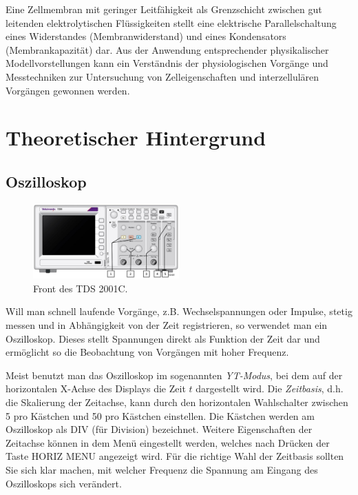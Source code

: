 Eine Zellmembran mit geringer Leitfähigkeit als Grenzschicht zwischen gut leitenden elektrolytischen Flüssigkeiten stellt eine elektrische Parallelschaltung eines Widerstandes (Membranwiderstand) und eines Kondensators (Membrankapazität) dar. Aus der Anwendung entsprechender physikalischer Modellvorstellungen kann ein Verständnis der physiologischen Vorgänge und Messtechniken zur Untersuchung von Zelleigenschaften und interzellulären Vorgängen gewonnen werden.

\section{Theoretischer Hintergrund}

\subsection{Oszilloskop} \label{chap:Oszilloskop}

\begin{figure}[hb]
	\centering
		\includegraphics[width=0.5\textwidth]{Abbildungen/TDS2000.JPG}
	\caption{Front des TDS 2001C.}
	\label{fig:TDS2000}
\end{figure}

Will man schnell laufende Vorgänge, z.B. Wechselspannungen oder Impulse, stetig messen und in Abhängigkeit von der Zeit registrieren, so verwendet man ein Oszilloskop. Dieses stellt Spannungen direkt als Funktion der Zeit dar und ermöglicht so die Beobachtung von Vorgängen mit hoher Frequenz.

  Meist benutzt man das Oszilloskop im sogenannten \textit{YT-Modus}, bei dem auf der horizontalen X-Achse des Displays die Zeit $t$ dargestellt wird. Die \textit{Zeitbasis}, d.h. die Skalierung der Zeitachse, kann durch den horizontalen Wahlschalter zwischen \unit{5}{\nano\second} pro Kästchen und \unit{50}{\second} pro Kästchen einstellen. 
  Die Kästchen werden am Oszilloskop als DIV (für Division) bezeichnet. 
  Weitere Eigenschaften der Zeitachse können in dem Menü eingestellt werden, welches nach Drücken der 
  Taste HORIZ MENU angezeigt wird. Für die richtige Wahl der Zeitbasis sollten Sie sich klar machen, mit welcher Frequenz die Spannung am Eingang des Oszilloskops sich verändert.

